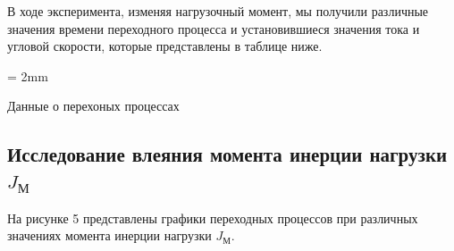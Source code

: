\documentclass[a4paper, 12pt]{article}
\begin{document}
В ходе эксперимента, изменяя нагрузочный момент, мы получили различные значения времени переходного процесса и установившиеся значения тока и угловой скорости, которые представлены в таблице ниже.

\begin{table}[h!]
	\tabulinesep = 2mm
	\centering
	\begin{threeparttable}
        \caption{Данные о перехоных процессах}
 	\end{threeparttable}
\end{table}

\newpage
\begin{center}
	

\section{Исследование влеяния момента инерции нагрузки $J_\text{М}$}
\end{center}
\par На рисунке 5 представлены графики переходных процессов при различных значениях момента инерции нагрузки $J_\text{М}$.
\end{document}

